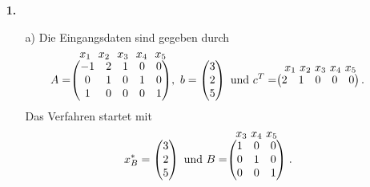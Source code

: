 \documentclass [a4paper,11pt]{article}
\author{\authorinfotitle}
\title{\titleinfo}
\date{\today}
\begin{document}
\maketitle
    \begin{enumerate}
        \item[\textbf{1.}]
        \begin{enumerate}
        \item[a)]
            Die Eingangsdaten sind gegeben durch
            \begin{align*}
                A =
                \stackrel{\mbox{$ \ x_1\ \ x_2\ \ x_3\ \ x_4\ \ x_5$}}{%
                    \begin{pmatrix}
                        -1 & 2 & 1 & 0 & 0\\
                         0 & 1 & 0 & 1 & 0\\
                         1 & 0 & 0 & 0 & 1
                    \end{pmatrix}
                  },\ b = 
                \begin{pmatrix}
                    3\\
                    2\\
                    5
                \end{pmatrix}\ \text{und}\ c^T =
                \stackrel{\mbox{$x_1\ x_2\ x_3\ x_4\ x_5$}}{
                    \begin{pmatrix}
                       2 & 1 & 0 & 0 & 0
                    \end{pmatrix}\text{.}
                }
            \end{align*}
            Das Verfahren startet mit
            \begin{align*}
                x^*_B =
                \begin{pmatrix}
                    3\\
                    2\\
                    5
                \end{pmatrix}\ \text{und}\ B =
                \stackrel{\mbox{$ x_3\ x_4\ x_5 $}}{
                    \begin{pmatrix}
                        1 & 0 & 0\\
                        0 & 1 & 0\\
                        0 & 0 & 1
                    \end{pmatrix}
                }
                \text{.}
            \end{align*}


\end{enumerate}
\end{enumerate}
\end{document}
